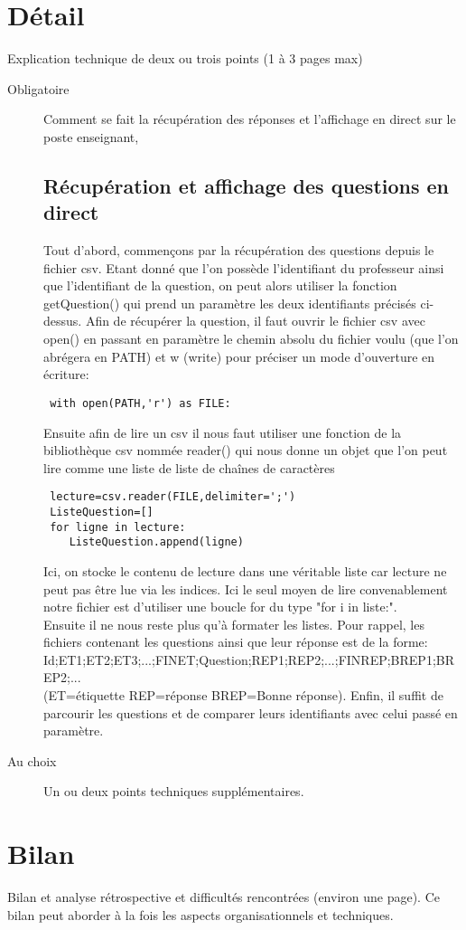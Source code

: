 \documentclass[a4paper, 12pt]{article}
\begin{document}
    
\section{Détail}

Explication technique de deux ou trois points (1 à 3 pages max)
\begin{description}
\item[Obligatoire] Comment se fait la récupération des réponses et l'affichage
en direct sur le poste enseignant,

\subsection{Récupération et affichage des questions en direct}

Tout d'abord, commençons par la récupération des questions depuis le fichier csv. 
Etant donné que l'on possède l'identifiant du professeur ainsi que l'identifiant de la question, on peut alors utiliser la fonction getQuestion() qui prend un paramètre les deux identifiants précisés ci-dessus. 
Afin de récupérer la question, il faut ouvrir le fichier csv avec open() en passant en paramètre le chemin absolu du fichier voulu (que l'on abrégera en PATH) et w (write) pour préciser un mode d'ouverture en écriture: 

\begin{lstlisting}
 with open(PATH,'r') as FILE:
\end{lstlisting}

Ensuite afin de lire un csv il nous faut utiliser une fonction de la bibliothèque
csv nommée reader() qui nous donne un objet que l'on peut lire comme une liste de 
liste de chaînes de caractères

\begin{lstlisting}
 lecture=csv.reader(FILE,delimiter=';')
 ListeQuestion=[]
 for ligne in lecture:
    ListeQuestion.append(ligne)
\end{lstlisting}

Ici, on stocke le contenu de lecture dans une véritable liste car lecture
ne peut pas être lue via les indices. 
Ici le seul moyen de lire convenablement notre fichier est d'utiliser une boucle for du type "for i in liste:". \\
Ensuite il ne nous reste plus qu'à formater les listes. 
Pour rappel, les fichiers contenant les questions ainsi que leur réponse est de la forme: \\
Id;ET1;ET2;ET3;...;FINET;Question;REP1;REP2;...;FINREP;BREP1;BREP2;...\\
(ET=étiquette REP=réponse BREP=Bonne réponse).
Enfin, il suffit de parcourir les questions et de comparer leurs identifiants avec celui passé en paramètre. 

\item[Au choix] Un ou deux  points techniques supplémentaires.  
\end{description}

\section{Bilan}

Bilan et analyse rétrospective et difficultés rencontrées (environ une page). 
Ce bilan peut aborder à la fois les aspects organisationnels et techniques.

    
\end{document}
